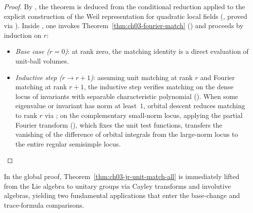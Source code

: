 \begin{proof}
By , the theorem is deduced from the
conditional reduction
 applied
to the explicit construction of the Weil representation for quadratic local
fields (,
proved via ).
Inside , one invokes
Theorem~\ref{thm:ch03-fourier-match}
() and
proceeds by induction on $r$:
\begin{itemize}
  \item \emph{Base case ($r = 0$)}: at rank zero, the matching identity
         is a direct
        evaluation of unit-ball volumes.
  \item \emph{Inductive step ($r \to r + 1$)}: assuming unit matching at rank
        $r$ and Fourier matching at rank $r + 1$, the inductive step
         verifies matching on
        the dense locus of invariants with separable characteristic polynomial
        ().
        When some eigenvalue or invariant has norm at least~$1$, orbital
        descent reduces matching to rank $r$ via
        ; on the
        complementary small-norm locus, applying the partial Fourier transform
        (),
        which fixes the unit test functions, transfers the vanishing of the
        difference of orbital integrals from the large-norm locus to the
        entire regular semisimple locus.
\end{itemize}
\end{proof}

In the global proof, Theorem~\ref{thm:ch03-jr-unit-match-all} is immediately
lifted from the Lie algebra to unitary groups via Cayley transforms and
involutive algebras, yielding two fundamental applications that enter the
base-change and trace-formula comparisons.

